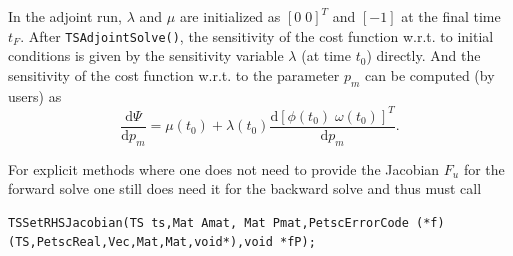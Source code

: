 {In the adjoint run, $\lambda$ and $\mu$ are initialized as $[ 0 \;  0 ]^T$ and $[-1]$ at the final time $t_F$.
After \lstinline{TSAdjointSolve()}, the sensitivity of the cost function w.r.t. to initial conditions is given by the sensitivity variable $\lambda$ (at time $t_0$) directly.
And the sensitivity of the cost function w.r.t. to the parameter $p_m$ can be computed (by users) as
%
\[
\frac{\mathrm{d} \Psi}{\mathrm{d} p_m} = \mu(t_0) + \lambda(t_0)  \frac{\mathrm{d} \left[ \phi(t_0) \; \omega(t_0) \right]^T}{\mathrm{d} p_m}  .
\]

For explicit methods where one does not need to provide the
Jacobian $F_u$ for the forward solve one still does need it for the
backward solve and thus must call
\begin{lstlisting}
TSSetRHSJacobian(TS ts,Mat Amat, Mat Pmat,PetscErrorCode (*f)(TS,PetscReal,Vec,Mat,Mat,void*),void *fP);
\end{lstlisting}

}
